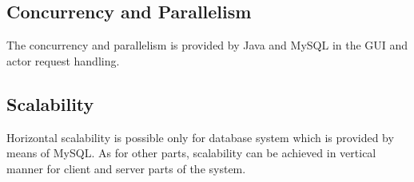 \subsection{Concurrency and Parallelism}
The concurrency and parallelism is provided by Java and MySQL in the GUI and
actor request handling.

\subsection{Scalability}
Horizontal scalability is possible only for database system which is provided
by means of MySQL. As for other parts, scalability can be achieved in vertical
manner for client and server parts of the system. 
